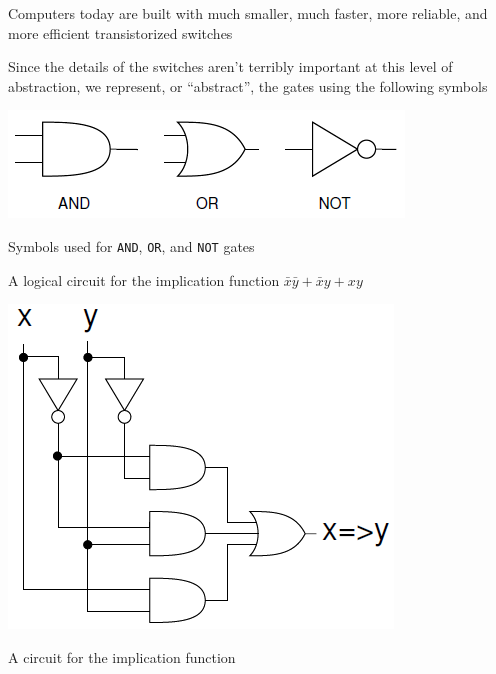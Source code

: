 \documentclass[8pt,a4paper,compress]{beamer}
\begin{document}
\begin{frame}[fragile]
Computers today are built with much smaller, much faster, more reliable, and more efficient transistorized switches 

\bigskip

Since the details of the switches aren't terribly important at this level of abstraction, we represent, or ``abstract'', the gates using the following symbols
\begin{center}
\includegraphics[scale=0.3]{figures/gate_symbols.png}

\smallskip

\tiny Symbols used for \lstinline{AND}, \lstinline{OR}, and \lstinline{NOT} gates
\end{center}

\bigskip

A logical circuit for the implication function $\bar{x}\bar{y}+\bar{x}y+xy$
\begin{center}
\includegraphics[scale=0.22]{figures/implication_circuit.png}

\smallskip

\tiny A circuit for the implication function
\end{center}
\end{frame}
\end{document}
